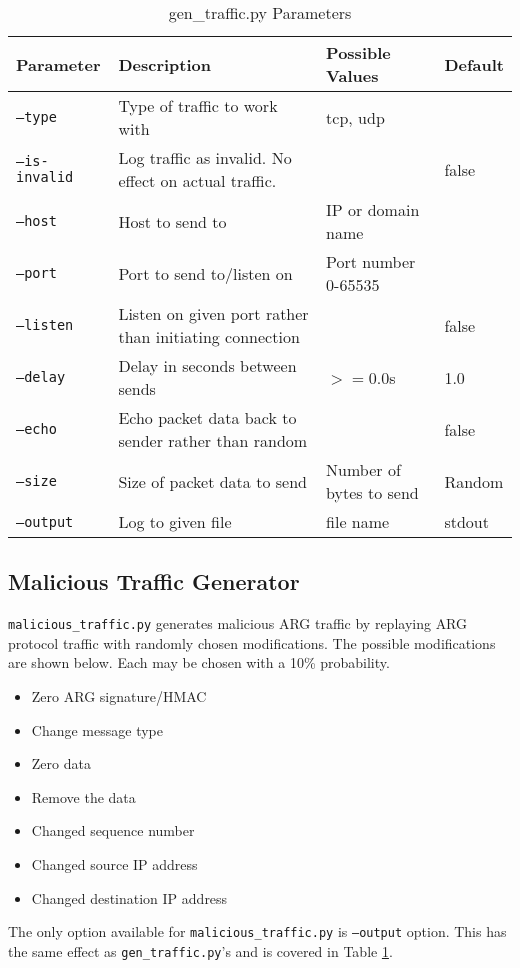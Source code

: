 \begin{table}
\caption{gen\_traffic.py Parameters}
\label{tbl:gen_traffic_param}
\centering
\begin{tabular}{l|p{2in}|l|l}
Parameter & Description & Possible Values & Default\\
\hline
\texttt{--type} & Type of traffic to work with & tcp, udp & \\
\texttt{--is-invalid} & Log traffic as invalid. No effect on actual traffic. & & false\\
\texttt{--host} & Host to send to & \ac{IP} or domain name & \\
\texttt{--port} & Port to send to/listen on & Port number 0-65535 & \\
\texttt{--listen} & Listen on given port rather than initiating connection & & false\\
\texttt{--delay} & Delay in seconds between sends & $>=$0.0s & 1.0\\
\texttt{--echo} & Echo packet data back to sender rather than random & & false\\
\texttt{--size} & Size of packet data to send & Number of bytes to send & Random\\
\texttt{--output} & Log to given file & file name & stdout
\end{tabular}
\end{table}

\subsection{Malicious Traffic Generator}
\par \texttt{malicious\_traffic.py} generates malicious ARG traffic by replaying \ac{ARG} protocol traffic with randomly chosen modifications. The possible modifications are shown below. Each may be chosen with a 10\% probability.
{\singlespace
\begin{itemize}
\item Zero \ac{ARG} signature/\ac{HMAC}
\item Change message type
\item Zero data
\item Remove the data
\item Changed sequence number
\item Changed source \ac{IP} address
\item Changed destination \ac{IP} address
\end{itemize}
}

\par The only option available for \texttt{malicious\_traffic.py} is \texttt{--output} option. This has the same effect as \texttt{gen\_traffic.py}'s and is covered in Table \ref{tbl:gen_traffic_param}.

